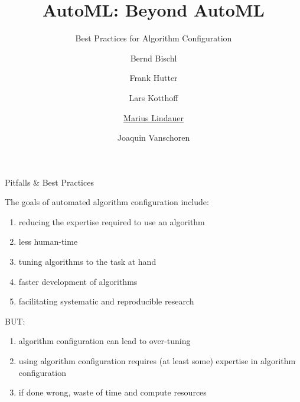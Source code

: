 


\title[AutoML: Capping]{AutoML: Beyond AutoML}
\subtitle{Best Practices for Algorithm Configuration}
\author[Marius Lindauer]{Bernd Bischl \and Frank Hutter \and Lars Kotthoff\newline \and \underline{Marius Lindauer} \and Joaquin Vanschoren}
\institute{}
\date{}





	
	\maketitle
	

\begin{frame}[c]{Pitfalls \& Best Practices}

The \alert{goals} of automated algorithm configuration include:

\begin{enumerate}
	\pause
	\item reducing the expertise required to use an algorithm
	\pause
	\item less human-time
	\pause
	\item tuning algorithms to the task at hand
	\pause
	\item faster development of algorithms
	\pause
	\item facilitating systematic and reproducible research
\end{enumerate}

\bigskip
\alert{BUT}:

\begin{enumerate}
	\item algorithm configuration can lead to over-tuning
	\pause
	\item using algorithm configuration requires (at least some) expertise in algorithm configuration
	\pause
	\item if done wrong, waste of time and compute resources
\end{enumerate}

\end{frame}

